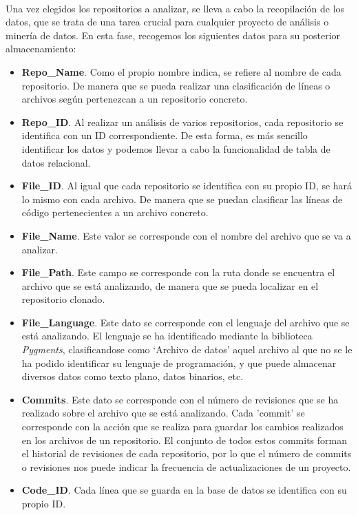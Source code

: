 \documentclass[a4paper, 12pt]{book}
\begin{document}
 \\Una vez elegidos los repositorios a analizar, se lleva a cabo la recopilación de los datos, que se trata de una tarea crucial para cualquier proyecto de análisis o minería de datos. En esta fase, recogemos los siguientes datos para su posterior 
almacenamiento:

\begin{itemize}
  \item \textbf{Repo\_Name}. Como el propio nombre indica, se refiere al nombre de cada repositorio. De manera que se pueda realizar una clasificación de líneas o archivos según pertenezcan a un repositorio concreto.
  \item \textbf{Repo\_ID}. Al realizar un análisis de varios repositorios, cada repositorio se identifica con un ID correspondiente. De esta forma, es más sencillo identificar los datos y podemos llevar a cabo la funcionalidad
  de tabla de datos relacional.
  \item \textbf{File\_ID}. Al igual que cada repositorio se identifica con su propio ID, se hará lo mismo con cada archivo. De manera que se puedan clasificar las líneas de código pertenecientes a un archivo concreto.
  \item \textbf{File\_Name}. Este valor se corresponde con el nombre del archivo que se va a analizar.
  \item \textbf{File\_Path}. Este campo se corresponde con la ruta donde se encuentra el archivo que se está analizando, de manera que se pueda localizar en el repositorio clonado.
  \item \textbf{File\_Language}. Este dato se corresponde con el lenguaje del archivo que se está analizando. El lenguaje se ha identificado mediante la biblioteca \textit{Pygments}, clasificandose como `Archivo de datos' aquel
  archivo al que no se le ha podido identificar su lenguaje de programación, y que puede almacenar diversos datos como texto plano, datos binarios, etc. 
  \item \textbf{Commits}. Este dato se corresponde con el número de revisiones que se ha realizado sobre el archivo que se está analizando. Cada 'commit' se corresponde con la acción que se realiza para guardar los cambios realizados en los archivos de 
  un repositorio. El conjunto de todos estos commits forman el historial de revisiones de cada repositorio, por lo que el número de commits o revisiones nos puede indicar la frecuencia de actualizaciones de un proyecto.
  \item \textbf{Code\_ID}. Cada línea que se guarda en la base de datos se identifica con su propio ID.

\end{itemize}
\end{document}
